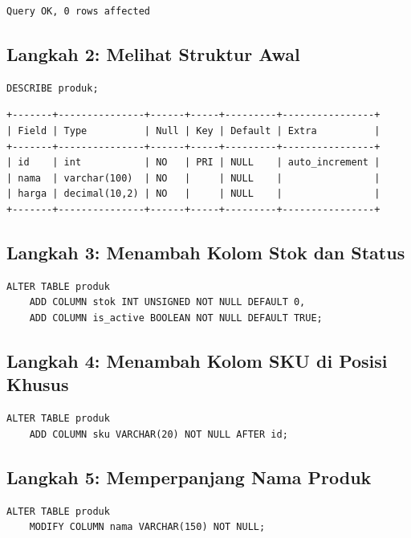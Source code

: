 \documentclass[11pt,a4paper]{article}
\begin{document}
\begin{lstlisting}[style=out]
Query OK, 0 rows affected
\end{lstlisting}

\subsection{Langkah 2: Melihat Struktur Awal}

\begin{lstlisting}[style=code]
DESCRIBE produk;
\end{lstlisting}

\begin{lstlisting}[style=out]
+-------+---------------+------+-----+---------+----------------+
| Field | Type          | Null | Key | Default | Extra          |
+-------+---------------+------+-----+---------+----------------+
| id    | int           | NO   | PRI | NULL    | auto_increment |
| nama  | varchar(100)  | NO   |     | NULL    |                |
| harga | decimal(10,2) | NO   |     | NULL    |                |
+-------+---------------+------+-----+---------+----------------+
\end{lstlisting}

\subsection{Langkah 3: Menambah Kolom Stok dan Status}

\begin{lstlisting}[style=code]
ALTER TABLE produk
    ADD COLUMN stok INT UNSIGNED NOT NULL DEFAULT 0,
    ADD COLUMN is_active BOOLEAN NOT NULL DEFAULT TRUE;
\end{lstlisting}

\subsection{Langkah 4: Menambah Kolom SKU di Posisi Khusus}

\begin{lstlisting}[style=code]
ALTER TABLE produk
    ADD COLUMN sku VARCHAR(20) NOT NULL AFTER id;
\end{lstlisting}

\subsection{Langkah 5: Memperpanjang Nama Produk}

\begin{lstlisting}[style=code]
ALTER TABLE produk
    MODIFY COLUMN nama VARCHAR(150) NOT NULL;
\end{lstlisting}
\end{document}
